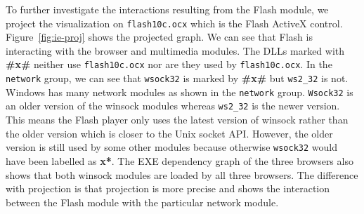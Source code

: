 To further investigate the interactions resulting from the Flash module,
we project the visualization on {\tt flash10c.ocx} which is
the Flash ActiveX control.
Figure~\ref{fig:ie-proj} shows the projected graph.
We can see that Flash is interacting with the browser and multimedia modules.
The DLLs marked with {\bf \#x\#} neither use {\tt flash10c.ocx}
nor are they used by {\tt flash10c.ocx}.
In the {\tt network} group,
we can see that {\tt wsock32} is marked by {\bf \#x\#} but
{\tt ws2\_32} is not.
Windows has many network modules as shown in the {\tt network} group.
{\tt Wsock32} is an
older version of the winsock modules whereas {\tt ws2\_32} is the newer version.
This means the Flash player only uses the latest version of winsock rather
than the older version which is closer to the Unix socket API.
However, the older version is still used by some other modules
because otherwise {\tt wsock32} would have been labelled as {\bf *x*}.
The EXE dependency graph of the three browsers also shows that
both winsock modules are loaded by all three browsers.
The difference with projection is that projection is
more precise and shows the interaction between
the Flash module with the particular network module.

